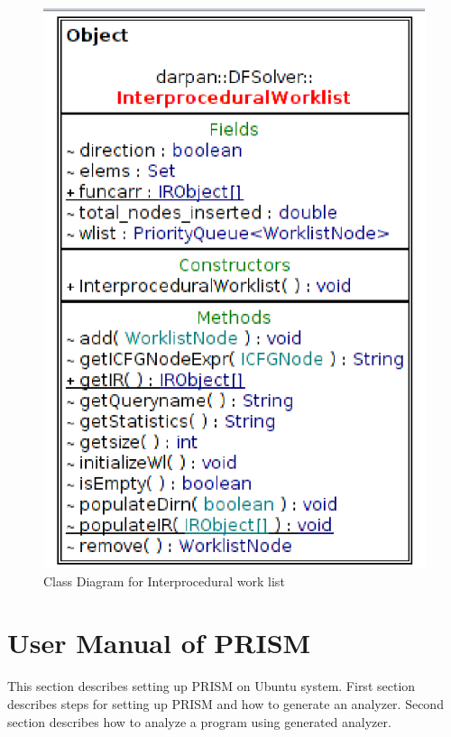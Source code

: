 \documentclass[11pt,a4paper,openright]{report}
\begin{document}
\begin{enumerate}
\begin{figure}[H]
\includegraphics[scale=0.8]{class_diagrams/updatedClassDiagrams/InterproceduralWL_C.eps}
\caption{Class Diagram for Interprocedural work list}
\label{fig:interproceduralworklist}
\end{figure}

\end{enumerate}



\chapter{User Manual of PRISM} \label{ap:A}
This section describes setting up PRISM on Ubuntu system. First section describes steps for setting up PRISM and how to generate an analyzer.
Second section describes how to analyze a program using generated analyzer.
\end{document}

